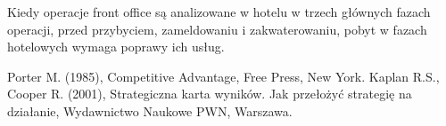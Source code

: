 \documentclass[a4paper, 12pt]{article}
\begin{document}
Kiedy operacje front office są analizowane w hotelu w trzech głównych fazach operacji, przed przybyciem, zameldowaniu i zakwaterowaniu, pobyt w fazach hotelowych wymaga poprawy ich usług.
\begin{thebibliography}{}
	  Porter M. (1985), Competitive Advantage, Free Press, New York. 
	 Kaplan R.S., Cooper R. (2001), Strategiczna karta wyników. Jak przełożyć strategię na działanie, Wydawnictwo Naukowe PWN, Warszawa. 
\end{thebibliography}
\label{LastPage}~
\label{LastPageOfBackMatter}~		
\end{document}
